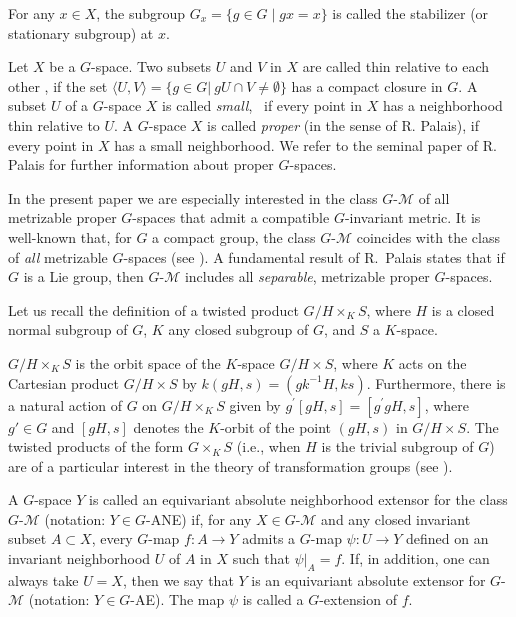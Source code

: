 \documentclass{amsart}
\begin{document}
For any $x\in X$, the subgroup   $G_x =\{g\in G   \mid  gx=x\}$ is called  the stabilizer (or stationary subgroup) at $x$.

\smallskip

 Let  $X$ be  a $G$-space. Two subsets  $U$ and $V$ in  $X$  are called  thin relative to each other   \cite[Definition 1.1.1]{pal:61},  if the set 
$\langle U,V\rangle=\{g\in G | \ gU\cap V\ne \emptyset\}$
    has  a compact closure in $G$. 
   A subset $U$ of a $G$-space $X$ is called {\it small}, \ if  every point in $X$ has a neighborhood thin relative to $U$. A $G$-space $X$ 
is called  {\it  proper} (in the sense of R. Palais),  if   every point in  $X$ has a small neighborhood. We refer to the seminal paper of R. Palais \cite{pal:61} for further information about proper $G$-spaces.



\smallskip

In the present  paper we are especially interested in the class $G$-$\mathcal M$ of  all  metrizable proper $G$-spaces  that admit a compatible $G$-invariant metric. 
It is well-known that, for $G$ a compact group, the class $G$-$\mathcal M$
coincides with the class of {\it all} metrizable $G$-spaces (see \cite[Proposition 1.1.12]{pal:60}).
A  fundamental result of  R.~Palais \cite[Theorem~4.3.4]{pal:61}
states that if $G$ is a Lie group, then  $G$-$\mathcal M$ includes all {\it separable}, metrizable  proper $G$-spaces.




 Let us recall the definition of a twisted product $G/H\times_K S$, where $H$ is a closed normal subgroup of $G$,  $K$  any closed subgroup of $G$,  and   $S$  a $K$-space. 
 
$G/H\times_KS$ is the orbit space of the $K$-space $G/H\times S$, where $K$ acts on the Cartesian product $G/H\times S$ by $k(gH, s)=(gk^{-1}H, ks)$. Furthermore, there is a natural action of $G$ on $G/H\times_K S$ given by $g^\prime[gH, s]=[g^\prime gH, s]$, where $g'\in G$ and $[gH, s]$ denotes the  $K$-orbit of the point $(gH, s)$ in $G/H\times S$. The twisted products of the form $G\times_KS$ (i.e., when $H$ is  the trivial subgroup of $G$) are  of a particular interest in the theory of transformation groups (see \cite[Ch.~II, \S~2]{bre:72}). 

 \smallskip


A $G$-space  $Y$ is called an equivariant absolute neighborhood extensor  for the class  $G$-$\mathcal M$ 
(notation: $Y\in G$-{\rm ANE})  if,   for any  $X\in G$-$\mathcal M$  and any closed invariant subset $A\subset X$, every    $G$-map $f:A\to Y$ admits a $G$-map $\psi\colon U\to Y$ defined on 
  an invariant neighborhood $U$ of $A$ in $X$ such that $\psi|_A= f$. If, in addition, one  can always take $U=X$, then we say that $Y$ is an equivariant absolute extensor  for  $G$-$\mathcal M$ 
  (notation: $Y\in G$-AE). The map $\psi$ is called a $G$-extension of $f$.
\end{document}
